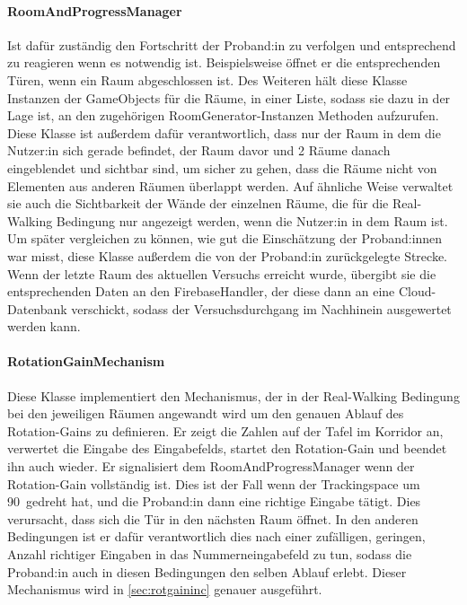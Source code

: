 \begin{multicols*}{2}
    \paragraph{RoomAndProgressManager}
    Ist dafür zuständig den Fortschritt der Proband:in zu verfolgen und entsprechend zu reagieren wenn es notwendig ist. Beispielsweise öffnet er die entsprechenden Türen, wenn ein Raum abgeschlossen ist.
    Des Weiteren hält diese Klasse Instanzen der GameObjects für die Räume, in einer Liste, sodass sie dazu in der Lage ist, an den zugehörigen RoomGenerator-Instanzen Methoden aufzurufen. Diese Klasse ist außerdem dafür verantwortlich, dass nur der Raum in dem die Nutzer:in sich gerade befindet, der Raum davor und 2 Räume danach eingeblendet und sichtbar sind, um sicher zu gehen, dass die Räume nicht von Elementen aus anderen Räumen überlappt werden. Auf ähnliche Weise verwaltet sie auch die Sichtbarkeit der Wände der einzelnen Räume, die für die Real-Walking Bedingung nur angezeigt werden, wenn die Nutzer:in in dem Raum ist.
    Um später vergleichen zu können, wie gut die Einschätzung der Proband:innen war misst, diese Klasse außerdem die von der Proband:in zurückgelegte Strecke. Wenn der letzte Raum des aktuellen Versuchs erreicht wurde, übergibt sie die entsprechenden Daten an den FirebaseHandler, der diese dann an eine Cloud-Datenbank verschickt, sodass der Versuchsdurchgang im Nachhinein ausgewertet werden kann.

    \paragraph{RotationGainMechanism}

    Diese Klasse implementiert den Mechanismus, der in der Real-Walking Bedingung bei den jeweiligen Räumen angewandt wird um den genauen Ablauf des Rotation-Gains zu definieren. Er zeigt die Zahlen auf der Tafel im Korridor an, verwertet die Eingabe des Eingabefelds, startet den Rotation-Gain und beendet ihn auch wieder. Er signalisiert dem RoomAndProgressManager wenn der Rotation-Gain vollständig ist. Dies ist der Fall wenn der Trackingspace um
    90\textdegree\
    gedreht hat, und die Proband:in dann eine richtige Eingabe tätigt. Dies verursacht, dass sich die Tür in den nächsten Raum öffnet. In den anderen Bedingungen ist er dafür verantwortlich dies nach einer zufälligen, geringen, Anzahl richtiger Eingaben in das Nummerneingabefeld zu tun, sodass die Proband:in auch in diesen Bedingungen den selben Ablauf erlebt. Dieser Mechanismus wird in \autoref{sec:rotgaininc} genauer ausgeführt.


\end{multicols*}

